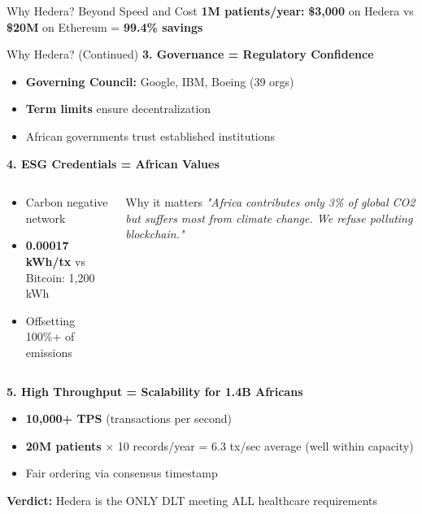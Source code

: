 \documentclass[aspectratio=169,xcolor=dvipsnames,14pt]{beamer}
\newcommand{\checkitem}{\item[\color{SuccessGreen}\faCheckCircle]}
\begin{document}
\begin{frame}[shrink=10]{Why Hedera? Beyond Speed and Cost}
  \small
  \textbf{1M patients/year:} \textcolor{SuccessGreen}{\textbf{\$3,000}} on Hedera vs \textcolor{DangerRed}{\textbf{\$20M}} on Ethereum = \textbf{99.4\% savings}

\end{frame}

\begin{frame}[shrink=5]{Why Hedera? (Continued)}
\small
  \textbf{\textcolor{HederaPurple}{3. Governance = Regulatory Confidence}}

  \begin{itemize}
    \checkitem \textbf{Governing Council:} Google, IBM, Boeing (39 orgs)
    \checkitem \textbf{Term limits} ensure decentralization
    \checkitem African governments trust established institutions
  \end{itemize}

  \vspace{0.2cm}

  \textbf{\textcolor{HederaPurple}{4. ESG Credentials = African Values}}

  \begin{columns}[T]
    \begin{column}{0.5\textwidth}
      \begin{itemize}
        \checkitem \textcolor{SuccessGreen}{Carbon negative} network
        \checkitem \textbf{0.00017 kWh/tx} vs Bitcoin: 1,200 kWh
        \checkitem Offsetting 100\%+ of emissions
      \end{itemize}
    \end{column}

    \begin{column}{0.5\textwidth}
      \begin{block}{Why it matters}
        \textit{"Africa contributes only 3\% of global CO2 but suffers most from climate change. We refuse polluting blockchain."}
      \end{block}
    \end{column}
  \end{columns}

  \vspace{0.3cm}

  \textbf{\textcolor{HederaPurple}{5. High Throughput = Scalability for 1.4B Africans}}

  \begin{itemize}
    \checkitem \textbf{10,000+ TPS} (transactions per second)
    \checkitem \textbf{20M patients} × 10 records/year = 6.3 tx/sec average (well within capacity)
    \checkitem Fair ordering via consensus timestamp
  \end{itemize}

  \vspace{0.3cm}

  \begin{center}
    \Large{\textbf{Verdict:} \textcolor{HederaPurple}{Hedera is the ONLY DLT meeting ALL healthcare requirements}}
  \end{center}

\end{frame}
\end{document}
